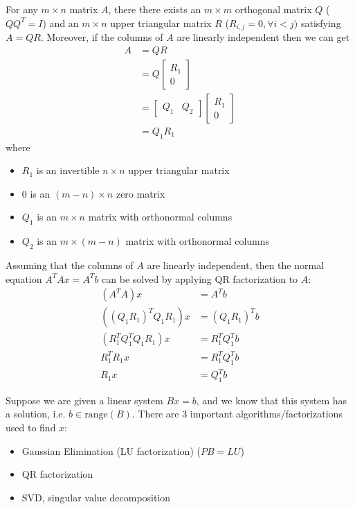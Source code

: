 \begin{definition}[QR Factorization]
  For any $m \times n$ matrix $A$, there there exists an $m \times m$ orthogonal matrix $Q$ ($QQ^T = I$) and an $m \times n$ upper triangular matrix $R$ ($R_{i,j} = 0, \forall i < j)$ satisfying $A = QR$. Moreover, if the columns of $A$ are linearly independent then we can get
  \begin{align*}
    A &= QR \\
    &= Q \begin{bmatrix}
      R_1 \\ 0
    \end{bmatrix} \\
    &= \begin{bmatrix}
      Q_1 & Q_2
    \end{bmatrix} \begin{bmatrix}
      R_1 \\ 0
    \end{bmatrix} \\
    &= Q_1R_1
  \end{align*}
  where 
  \begin{itemize}
    \item $R_1$ is an invertible $n \times n$ upper triangular matrix
    \item $0$ is an $(m - n) \times n$ zero matrix
    \item $Q_1$ is an $m \times n$ matrix with orthonormal columns
    \item $Q_2$ is an $m \times (m - n)$ matrix with orthonormal columns
  \end{itemize}
\end{definition}
\begin{theorem}
  Assuming that the columns of $A$ are linearly independent, then the normal equation $A^TAx = A^Tb$ can be solved by applying QR factorization to $A$:
  \begin{align*}
    (A^TA)x &= A^Tb \\
    ((Q_1R_1)^TQ_1R_1)x &= (Q_1R_1)^Tb \\
    (R_1^TQ_1^TQ_1R_1)x &= R_1^TQ_1^Tb \\
    R_1^TR_1x &= R_1^TQ_1^Tb \tag*{Since $Q_1$ is orthogonal}\\
    R_1x &= Q_1^Tb \tag*{Since $R_1$ is invertible}
  \end{align*}
\end{theorem}
\begin{definition}
  Suppose we are given a linear system $Bx = b$, and we know that this system has a solution, i.e. $b \in \text{range}(B)$. There are 3 important algorithms/factorizations used to find $x$:
  \begin{itemize}
    \item Gaussian Elimination (LU factorization) ($PB = LU$)
    \item QR factorization
    \item SVD, singular value decomposition
  \end{itemize}
\end{definition}
